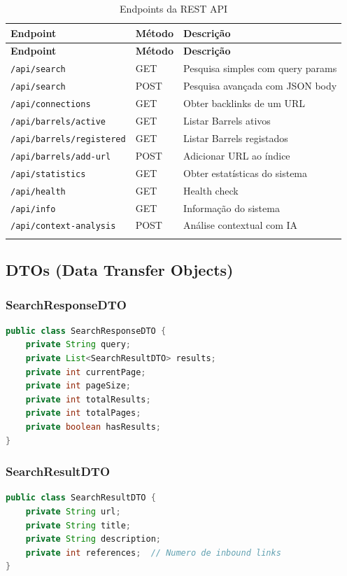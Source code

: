 \documentclass[12pt,a4paper]{article}
\begin{document}
\begin{longtable}{|p{5cm}|p{3.5cm}|p{7cm}|}
\hline
\textbf{Endpoint} & \textbf{Método} & \textbf{Descrição} \\
\hline
\endfirsthead
\hline
\textbf{Endpoint} & \textbf{Método} & \textbf{Descrição} \\
\hline
\endhead
\hline
\endfoot

\texttt{/api/search} & GET & Pesquisa simples com query params \\
\texttt{/api/search} & POST & Pesquisa avançada com JSON body \\
\texttt{/api/connections} & GET & Obter backlinks de um URL \\
\texttt{/api/barrels/active} & GET & Listar Barrels ativos \\
\texttt{/api/barrels/registered} & GET & Listar Barrels registados \\
\texttt{/api/barrels/add-url} & POST & Adicionar URL ao índice \\
\texttt{/api/statistics} & GET & Obter estatísticas do sistema \\
\texttt{/api/health} & GET & Health check \\
\texttt{/api/info} & GET & Informação do sistema \\
\texttt{/api/context-analysis} & POST & Análise contextual com IA \\
\hline
\caption{Endpoints da REST API}
\label{tab:endpoints}
\end{longtable}

\subsection{DTOs (Data Transfer Objects)}

\subsubsection{SearchResponseDTO}
\begin{lstlisting}[language=Java, caption={Estrutura de resposta de pesquisa}]
public class SearchResponseDTO {
    private String query;
    private List<SearchResultDTO> results;
    private int currentPage;
    private int pageSize;
    private int totalResults;
    private int totalPages;
    private boolean hasResults;
}
\end{lstlisting}

\subsubsection{SearchResultDTO}
\begin{lstlisting}[language=Java, caption={Estrutura de resultado individual}]
public class SearchResultDTO {
    private String url;
    private String title;
    private String description;
    private int references;  // Numero de inbound links
}
\end{lstlisting}
\end{document}
